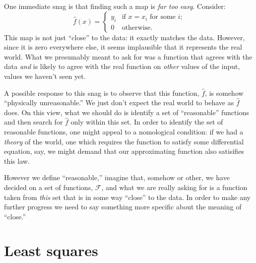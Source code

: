 \documentclass[10pt, a4paper]{article}
\begin{document}
One immediate snag is that finding such a map is \emph{far too
  easy}. Consider:
\begin{equation*}
  \hat{f}(x) =
  \begin{cases}
    y_i & \text{if $x = x_i$ for some $i$;} \\
      0 & \text{otherwise}.
  \end{cases}
\end{equation*}
This map is not just “close” to the data: it exactly matches the
data. However, since it is zero everywhere else, it seems implausible
that it represents the real world. What we presumably meant to ask for
was a function that agrees with the data \emph{and} is likely to agree
with the real function on \emph{other} values of the input, values we
haven't seen yet.

A possible response to this snag is to observe that this function,
$\hat{f}$, is somehow “physically unreasonable.” We just don't expect
the real world to behave as $\hat{f}$ does. On this view, what we
should do is identify a set of “reasonable” functions and then search
for $\hat{f}$ only within this set. In order to identify the set of
reasonable functions, one might appeal to a nomological condition: if
we had a \emph{theory} of the world, one which requires the function
to satisfy some differential equation, say, we might demand that our
approximating function also satisifies this law.

However we define “reasonable,” imagine that, somehow or other, we
have decided on a set of functions, $\mathcal{F}$, and what we are really asking
for is a function taken from \emph{this} set that is in some way
“close” to the data. In order to make any further progress we need to say
something more specific about the meaning of “close.”

\section{Least squares}
\end{document}
